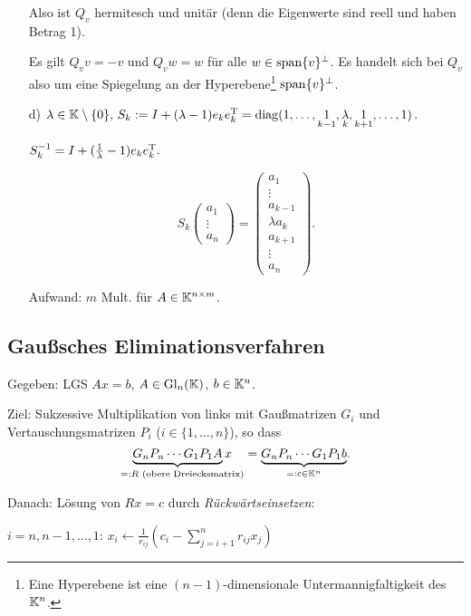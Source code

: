 \begin{Beispiele}[Elementarmatrizen]
\begin{itemize}
  Also ist $Q_v$ hermitesch und unitär (denn die Eigenwerte sind reell und
  haben Betrag 1).

  Es gilt $Q_v v = -v$ und $Q_v w = w$ für alle $w \in \operatorname*{\mathrm{span}}\{v\}^\perp$.
  Es handelt sich bei $Q_v$ also um eine Spiegelung an der Hyperebene\footnote{
  Eine Hyperebene ist eine $(n-1)$-dimensionale Untermannigfaltigkeit des $\mathbb K^n$.}
  $\operatorname*{\mathrm{span}}\{v\}^\perp$.

  \item[d)] \(
    \lambda \in \KK \setminus \{0\}$, $S_k := I + (\lambda - 1)e_ke_k^\T
      = \diag(1, \ldots, \underset{k-1}{1}, \underset{k}{\lambda}, \underset{k+1}{1}, \ldots, 1)
    \).

    $S_k^{-1} = I + (\frac{1}{\lambda} - 1) e_k e_k^\mathrm T.$

    \[
      S_k \begin{pmatrix} a_1 \\ \vdots \\ a_n \end{pmatrix}
        = \begin{pmatrix} a_1 \\ \vdots \\ a_{k-1} \\ \lambda a_k \\ a_{k+1} \\ \vdots \\ a_n \end{pmatrix}.
    \]

    Aufwand: $m$ Mult. für $A \in \mathbb K^{n\times m}$.
\end{itemize}
\end{Beispiele}

\subsection{Gaußsches Eliminationsverfahren}

Gegeben: LGS $Ax = b$, $A \in \mathrm{Gl}_n(\mathbb K)$, $b \in \mathbb K^n$.

Ziel: Sukzessive Multiplikation von links mit Gaußmatrizen $G_i$ und Vertauschungsmatrizen $P_i$ ($i \in \{1, \ldots, n\}$),
so dass \[
  \underset{=: R\text{ (obere Dreiecksmatrix)}}{\underbrace{
    G_nP_n \cdots G_1 P_1 A}x}
  = \underset{=: c \in \mathbb K^n}{\underbrace{
    G_nP_n \cdots G_1 P_1 b}}.
\]

Danach: Lösung von $Rx = c$ durch \emph{Rückwärtseinsetzen}:
\begin{codebox}
  \li \For $i = n, n-1, \ldots, 1$:
    \Do
      \li $x_i \gets \frac{1}{r_{ij}} \left( c_i - \sum_{j=i+1}^n r_{ij} x_j \right)$
    \End
\end{codebox}

